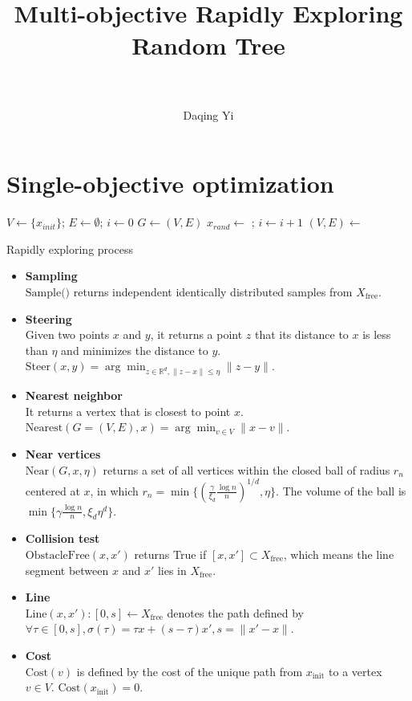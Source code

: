 \documentclass[paper=a4, fontsize=11pt]{scrartcl}
\title{
		\normalfont
		\horrule{0.5pt} \\[0.4cm]
		\huge Multi-objective Rapidly Exploring Random Tree \\
		\horrule{2pt} \\[0.5cm]
}
\author{
		\normalfont %
        Daqing Yi \\
}
\begin{document}
\maketitle

\section{Single-objective optimization}

\begin{algorithm}
\begin{algorithmic}[1]
\State $ V \leftarrow \{ x_{init} \} $; $ E \leftarrow \emptyset $; $ i \leftarrow 0 $
\State $ G \leftarrow (V, E) $
\State $ x_{rand} \leftarrow $  ; $ i \leftarrow i + 1 $
\State $ (V, E) \leftarrow $ 
\EndWhile
\end{algorithmic}
\label{alg:rapidly_exploring_process}
\caption{Rapidly exploring process}
\end{algorithm}

\begin{itemize}
\item \textbf{Sampling} \\
$ \mbox{Sample(}) $ returns independent identically distributed samples from $ X_{\mbox{free}} $.
\item \textbf{Steering} \\
Given two points $ x $ and $ y $, it returns a point $ z $ that its distance to $ x $ is less than $ \eta $ and minimizes the distance to $ y $. 
$ \mbox{Steer}(x,y) = \arg \min_{ z \in \mathbb{R}^{d}, \lVert z -x \rVert \leq \eta } \lVert z - y \rVert $.
\item \textbf{Nearest neighbor} \\
It returns a vertex that is closest to point $ x $.
$ \mbox{Nearest}(G = (V,E), x) = \arg \min_{v \in V} \lVert x - v \rVert $.
\item \textbf{Near vertices} \\
$ \mbox{Near}(G, x, \eta) $ returns a set of all vertices within the closed ball of radius $ r_{n} $ centered at $ x $, in which $ r_{n} = \min \{ ( \frac{\gamma}{\xi_{d}} \frac{\log n}{n} )^{1/d}  , \eta \} $.
The volume of the ball is $ \min \{ \gamma \frac{\log n}{n} , \xi_{d} \eta^{d} \} $.
\item \textbf{Collision test} \\
$ \mbox{ObstacleFree}(x, x') $ returns True if $ [ x, x' ] \subset X_{ \mbox{free} } $, which means the line segment between $ x $ and $ x' $ lies in $ X _{ \mbox{free} } $.
\item \textbf{Line} \\
$ \mbox{Line}(x, x') : [0, s] \leftarrow X_{ \mbox{free} } $ denotes the path defined by $ \forall \tau \in [0, s], \sigma( \tau ) = \tau x + (s - \tau) x', s = \lVert x' -x \rVert $.
\item \textbf{Cost} \\
$ \mbox{Cost}( v ) $ is defined by the cost of the unique path from $ x_{ \mbox{init} } $ to a vertex $ v \in V $.
$ \mbox{Cost}( x_{ \mbox{init} } ) = 0 $.
\end{itemize}
\end{document}
